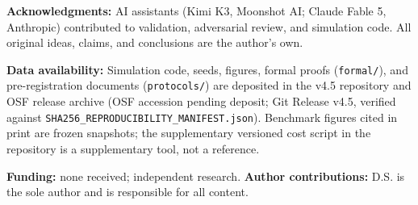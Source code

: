 \documentclass[11pt,twocolumn]{article}
\begin{document}
\textbf{Acknowledgments:} AI assistants (Kimi K3, Moonshot AI; Claude
Fable 5, Anthropic) contributed to validation, adversarial
review, and simulation code. All original ideas, claims, and conclusions are
the author's own.

\textbf{Data availability:} Simulation code, seeds, figures, formal proofs (\texttt{formal/}), and pre-registration documents (\texttt{protocols/}) are deposited in the v4.5 repository and OSF release archive (OSF accession pending deposit; Git Release v4.5, verified against \texttt{SHA256\_REPRODUCIBILITY\_MANIFEST.json}). Benchmark figures cited in print are frozen snapshots; the
supplementary versioned cost script in the repository is a supplementary tool, not a
reference. 

\textbf{Funding:} none received; independent research. \textbf{Author
contributions:} D.S. is the sole author and is responsible for all
content.

\nocite{*}


\end{document}
